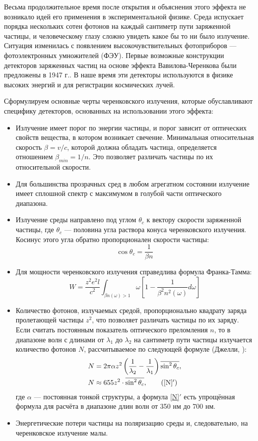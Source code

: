 \documentclass[12pt,a4paper]{report} %
\begin{document}
Весьма продолжительное время после открытия и объяснения этого эффекта не возникало идей его применения в экспериментальной физике. Среда испускает порядка нескольких сотен фотонов на каждый сантиметр пути заряженной частицы, и человеческому глазу  сложно увидеть какое бы то ни было излучение. Ситуация изменилась с появлением высокочувствительных фотоприборов --- фотоэлектронных умножителей (ФЭУ). Первые возможные конструкции детекторов заряженных частиц на основе эффекта Вавилова-Черенкова были предложены в 1947 г.. В наше время эти детекторы используются в физике высоких энергий и для регистрации космических лучей.

Сформулируем основные черты черенковского излучения, которые обуславливают специфику детекторов, основанных на использовании этого эффекта:
\begin{itemize}
	\item Излучение имеет порог по энергии частицы, и порог зависит от оптических свойств вещества, в котором возникает свечение. Минимальная относительная скорость $\beta = v/c$, которой должна обладать частица, определяется отношением $\beta_{min} = 1/n$. Это позволяет различать частицы по их относительной скорости.
	\item Для большинства прозрачных сред в любом агрегатном состоянии излучение имеет сплошной спектр с максимумом в голубой части оптического диапазона.
	\item Излучение среды направлено под углом $\theta_c$ к вектору скорости заряженной частицы, где $\theta_c$ --- половина угла раствора конуса черенковского излучения.
	 Косинус этого угла обратно пропорционален скорости частицы: 
\begin{equation} \label{costheta}
 \cos \theta_c = \frac{1}{\beta n}
\end{equation}
	\item Для мощности черенковского излучения справедлива формула Франка-Тамма:
\begin{equation} \label{FrankTammEquation}
 W = \frac{z^2 e^2 l}{c^2} \int_{\beta n(\omega)>1}
 \omega \left[ 1 - \frac{1}{\beta^2 n^2 (\omega)} d\omega \right]
\end{equation}
	\item Количество фотонов, излучаемых средой, пропорционально квадрату заряда пролетающей частицы $z^2$, что позволяет различать частицы по их заряду. Если считать постоянным показатель оптического преломления $n$, то в диапазоне волн с длинами от $\lambda_1$  до $\lambda_2$ на сантиметр пути частицы излучается количество фотонов $N$, рассчитываемое по следующей формуле (Джелли, \cite{Jelley}):
\begin{align}
& N = 2\pi\alpha z^2 \left( \frac{1}{\lambda_2} - \frac{1}{\lambda_1} \right)\overline{\sin^2 \theta_c},\label{N} \\
& N \approx 655 z^2 \cdot \overline{\sin^2 \theta_c}, \tag{\ref{N}$'$}
\end{align}
где $\alpha$ --- постоянная тонкой структуры, а формула \ref{N}$'$ есть упрощённая формула для расчёта в диапазоне длин волн от 350 нм до 700 нм.
	\item Энергетические потери частицы на поляризацию среды и, следовательно, на черенковское излучение малы. 
\end{itemize}
\end{document}
